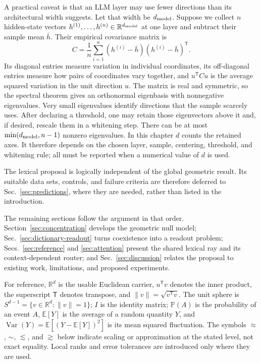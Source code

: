 \documentclass[
  aps,
  reprint,
  superscriptaddress,
  floatfix,
  nofootinbib,
  longbibliography
]{revtex4-2}
\newcommand{\R}{\mathbb{R}}
\newcommand{\E}{\mathbb{E}}
\newcommand{\Prob}{\mathbb{P}}
\newcommand{\Sph}[1]{S^{#1}}
\newcommand{\T}{^{\mathsf{T}}}
\newcommand{\norm}[1]{\lVert #1 \rVert}
\DeclareMathOperator{\Var}{Var}
\begin{document}
A practical caveat is that an LLM layer may use fewer directions than its
architectural width suggests.  Let that width be $d_{\rm model}$.  Suppose we
collect $n$ hidden-state vectors
$h^{(1)},\ldots,h^{(n)}\in\R^{d_{\rm model}}$ at one layer and subtract their sample mean $\bar h$.
Their empirical covariance matrix is
\begin{equation}
\label{eq:empirical-covariance}
C=\frac{1}{n}\sum_{i=1}^{n}
  (h^{(i)}-\bar h)(h^{(i)}-\bar h)\T .
\end{equation}
Its diagonal entries measure variation in individual coordinates, its
off-diagonal entries measure how pairs of coordinates vary together, and
$u\T C u$ is the average squared variation in the unit direction $u$.  The
matrix is real and symmetric, so the spectral theorem gives an orthonormal
eigenbasis with nonnegative eigenvalues.  Very small eigenvalues identify
directions that the sample scarcely uses.  After declaring a threshold, one
may retain those eigenvectors above it and, if desired, rescale them in a
whitening step.  There can be at most $\min(d_{\rm model},n-1)$ nonzero
eigenvalues.  In this chapter $d$ counts the retained axes.  It therefore
depends on the chosen layer, sample, centering, threshold, and whitening rule;
all must be reported when a numerical value of $d$ is used.

The lexical proposal is logically independent of the global geometric result.
Its suitable data sets, controls, and failure criteria are therefore deferred
to Sec.~\ref{sec:predictions}, where they are needed, rather than listed in the
introduction.

The remaining sections follow the argument in that order.
Section~\ref{sec:concentration} develops the geometric null model;
Sec.~\ref{sec:dictionary-readout} turns coexistence into a readout problem;
Secs.~\ref{sec:reference} and \ref{sec:attention} present the shared lexical
ray and its context-dependent router; and Sec.~\ref{sec:discussion} relates the
proposal to existing work, limitations, and proposed experiments.

For reference, $\R^d$ is the usable Euclidean carrier, $u\T v$ denotes the
inner product, the superscript $\mathsf T$ denotes transpose, and
$\norm{v}=\sqrt{v\T v}$.  The unit sphere is
$\Sph{d-1}=\{v\in\R^d:\norm v=1\}$; $I$ is the identity matrix;
$\Prob(A)$ is the probability of an event $A$, $\E[Y]$ is the average of a
random quantity $Y$, and
$\Var(Y)=\E[(Y-\E[Y])^2]$ is its mean squared fluctuation.  The
symbols $\approx$, $\sim$, $\lesssim$, and $\gtrsim$ below indicate scaling or
approximation at the stated level, not exact equality.  Local ranks and error
tolerances are introduced only where they are used.
\end{document}

